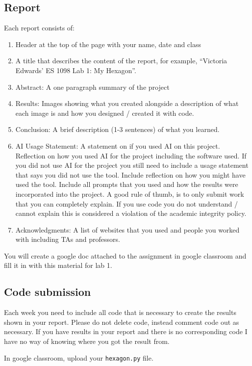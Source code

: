 \documentclass[12pt]{article}
\begin{document}
\subsection{Report}
Each report consists of:
\begin{enumerate}
\item Header at the top of the page with your name, date and class
\item A title that describes the content of the report, for example, ``Victoria Edwards' ES 1098 Lab 1: My Hexagon''. 
\item Abstract: A one paragraph summary of the project
\item Results: Images showing what you created alongside a description of what each image is and how you designed / created it with code.
\item Conclusion: A brief description (1-3 sentences) of what you learned.
\item AI Usage Statement: A statement on if you used AI on this project. Reflection on how you used AI for the project including the software used. If you did not use AI for the project you still need to include a usage statement that says you did not use the tool. Include reflection on how you might have used the tool. Include all prompts that you used and how the results were incorporated into the project. A good rule of thumb, is to only submit work that you can completely explain. If you use code you do not understand / cannot explain this is considered a violation of the academic integrity policy.
\item Acknowledgments: A list of websites that you used and people you worked with including TAs and professors.
\end{enumerate}

You will create a google doc attached to the assignment in google classroom and fill it in with this material for lab 1. 

\subsection{Code submission}
Each week you need to include all code that is necessary to create the results shown in your report.
Please do not delete code, instead comment code out as necessary.
If you have results in your report and there is no corresponding code I have no way of knowing where you got the result from.

In google classroom, upload your \texttt{hexagon.py} file.
\end{document}
